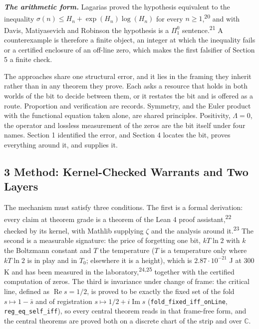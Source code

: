 \documentclass[10pt]{article}
\begin{document}
\textbf{\emph{The arithmetic form.}} Lagarias proved the hypothesis
equivalent to the inequality \(\sigma(n) \le H_n + \exp(H_n)\log(H_n)\)
for every \(n \ge 1\),\textsuperscript{20} and with Davis, Matiyasevich
and Robinson the hypothesis is a \(\Pi^0_1\)
sentence.\textsuperscript{21} A counterexample is therefore a finite
object, an integer at which the inequality fails or a certified
enclosure of an off-line zero, which makes the first falsifier of
Section 5 a finite check.

The approaches share one structural error, and it lies in the framing
they inherit rather than in any theorem they prove. Each asks a resource
that holds in both worlds of the bit to decide between them, or it
restates the bit and is offered as a route. Proportion and verification
are records. Symmetry, and the Euler product with the functional
equation taken alone, are shared principles. Positivity,
\(\Lambda = 0\), the operator and lossless measurement of the zeros are
the bit itself under four names. Section 1 identified the error, and
Section 4 locates the bit, proves everything around it, and supplies it.

\hypertarget{method-kernel-checked-warrants-and-two-layers}{%
\subsection{3 Method: Kernel-Checked Warrants and Two
Layers}\label{method-kernel-checked-warrants-and-two-layers}}

The mechanism must satisfy three conditions. The first is a formal
derivation: every claim at theorem grade is a theorem of the Lean 4
proof assistant,\textsuperscript{22} checked by its kernel, with Mathlib
supplying \(\zeta\) and the analysis around it.\textsuperscript{23} The
second is a measurable signature: the price of forgetting one bit,
\(kT \ln 2\) with \(k\) the Boltzmann constant and \(T\) the temperature
(\(T\) is a temperature only where \(kT \ln 2\) is in play and in
\(T_0\); elsewhere it is a height), which is \(2.87\cdot 10^{-21}\) J at
300 K and has been measured in the laboratory,\textsuperscript{24,25}
together with the certified computation of zeros. The third is
invariance under change of frame: the critical line, defined as
\(\operatorname{Re} s = 1/2\), is proved to be exactly the fixed set of
the fold \(s \mapsto 1 - \bar{s}\) and of registration
\(s \mapsto 1/2 + i\operatorname{Im} s\)
(\texttt{fold\_\allowbreak{}fixed\_\allowbreak{}iff\_\allowbreak{}onLine},
\texttt{reg\_\allowbreak{}eq\_\allowbreak{}self\_\allowbreak{}iff}), so
every central theorem reads in that frame-free form, and the central
theorems are proved both on a discrete chart of the strip and over
\(\mathbb{C}\).
\end{document}
